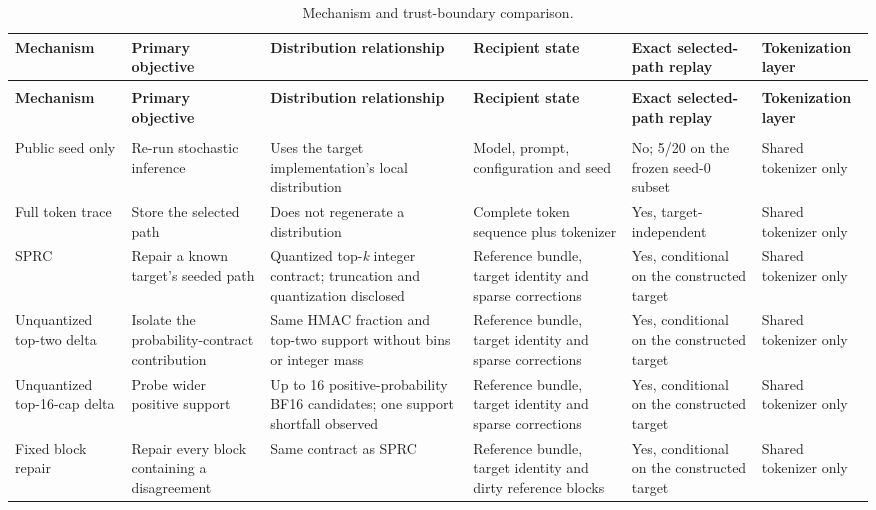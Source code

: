 \documentclass[11pt,a4paper]{article}
\begin{document}
\clearpage
\begingroup
\scriptsize
\setlength{\tabcolsep}{2.5pt}
\renewcommand{\arraystretch}{1.22}
\begin{xltabular}{\textwidth}{@{}>{\raggedright\arraybackslash}X *{5}{Y}@{}}
\caption{Mechanism and trust-boundary comparison.}\label{tab:s2} \\
\toprule
\textbf{Mechanism} & \textbf{Primary objective} & \textbf{Distribution relationship} & \textbf{Recipient state} & \textbf{Exact selected-path replay} & \textbf{Tokenization layer} \\
\midrule
\endfirsthead
{} \\
\toprule
\textbf{Mechanism} & \textbf{Primary objective} & \textbf{Distribution relationship} & \textbf{Recipient state} & \textbf{Exact selected-path replay} & \textbf{Tokenization layer} \\
\midrule
\endhead
\midrule
{} \\
\endfoot
\bottomrule
\endlastfoot
Public seed only & Re-run stochastic inference & Uses the target implementation's local distribution & Model, prompt, configuration and seed & No; 5/20 on the frozen seed-0 subset & Shared tokenizer only \\
Full token trace & Store the selected path & Does not regenerate a distribution & Complete token sequence plus tokenizer & Yes, target-independent & Shared tokenizer only \\
SPRC & Repair a known target's seeded path & Quantized top-\textit{k} integer contract; truncation and quantization disclosed & Reference bundle, target identity and sparse corrections & Yes, conditional on the constructed target & Shared tokenizer only \\
Unquantized top-two delta & Isolate the probability-contract contribution & Same HMAC fraction and top-two support without bins or integer mass & Reference bundle, target identity and sparse corrections & Yes, conditional on the constructed target & Shared tokenizer only \\
Unquantized top-16-cap delta & Probe wider positive support & Up to 16 positive-probability BF16 candidates; one support shortfall observed & Reference bundle, target identity and sparse corrections & Yes, conditional on the constructed target & Shared tokenizer only \\
Fixed block repair & Repair every block containing a disagreement & Same contract as SPRC & Reference bundle, target identity and dirty reference blocks & Yes, conditional on the constructed target & Shared tokenizer only \\

\end{xltabular}
\end{document}
